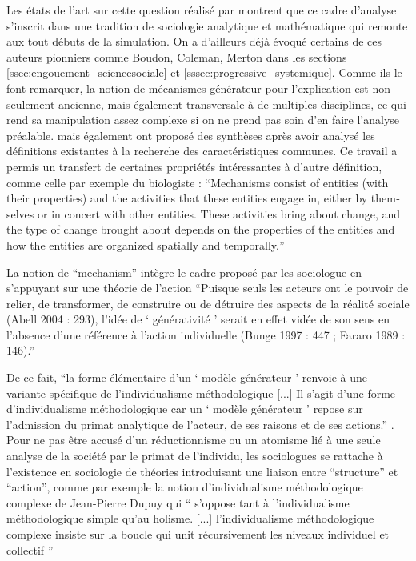 Les états de l'art sur cette question réalisé par \textcites{Manzo2005,Manzo2007, Hedstrom1998, Berger2010} montrent que ce cadre d'analyse s'inscrit dans une tradition de sociologie analytique et mathématique qui remonte aux tout débuts de la simulation. On a d'ailleurs déjà évoqué certains de ces auteurs pionniers comme Boudon, Coleman, Merton dans les sections \ref{ssec:engouement_sciencesociale} et \ref{sssec:progressive_systemique}. Comme ils le font remarquer, la notion de mécanismes générateur pour l'explication est non seulement ancienne, mais également transversale à de multiples disciplines, ce qui rend sa manipulation assez complexe si on ne prend pas soin d'en faire l'analyse préalable. \textcite{Hedstrom2010} mais également \textcite{Manzo2005} ont proposé des synthèses après avoir analysé les définitions existantes à la recherche des caractéristiques communes. Ce travail a permis un transfert de certaines propriétés intéressantes à d'autre définition, comme celle par exemple du biologiste \textcite{Machamer2000} : \foreignquote{english}{Mechanisms consist of entities (with their properties) and the activities that these entities engage in, either by themselves or in concert with other entities. These activities bring about change, and the type of change brought about depends on the properties of the entities and how the entities are organized spatially and temporally.}

La notion de \enquote{mechanism} intègre le cadre proposé par les sociologue en s'appuyant sur une théorie de l'action \enquote{Puisque seuls les acteurs ont le pouvoir de relier, de transformer, de construire ou de détruire des aspects de la réalité sociale (Abell 2004 : 293), l’idée de  \enquote{ générativité } serait en effet vidée de son sens en l’absence d’une référence à l’action individuelle (Bunge 1997 : 447 ; Fararo 1989 : 146).}

De ce fait, \enquote{la forme élémentaire d’un \enquote{ modèle générateur } renvoie à une variante spécifique de l’individualisme méthodologique [...] Il s’agit d’une forme d’individualisme méthodologique car un  \enquote{ modèle générateur } repose sur l’admission du primat analytique de l’acteur, de ses raisons et de ses actions.} \autocite{Manzo2007}. Pour ne pas être accusé d'un réductionnisme ou un atomisme lié à une seule analyse de la société par le primat de l'individu, les sociologues se rattache à l'existence en sociologie de théories introduisant une liaison entre \enquote{structure} et \enquote{action}, comme par exemple la notion d'individualisme méthodologique complexe de Jean-Pierre Dupuy \autocite{Dupuy2004} qui \enquote{ s’oppose tant à l’individualisme méthodologique simple qu’au holisme. [...] l’individualisme méthodologique complexe insiste sur la boucle qui unit récursivement les niveaux individuel et collectif } \autocite[9]{Manzo2007}

